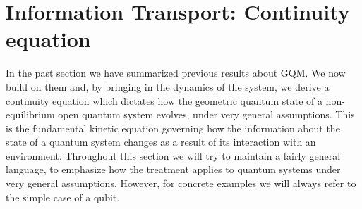 \documentclass[draft,nofootinbib,pre,twocolumn,showpacs,showkeys,preprintnumbers,floatfix]{revtex4-1}
\newcommand{\1}{\mathbbm{1}}
\begin{document}
\section{Information Transport: Continuity equation}
\label{sec:IT}

In the past section we have summarized previous results about GQM. We now build on them 
and, by bringing in the dynamics of the system, we derive 
a continuity equation which dictates how the geometric quantum state of a non-equilibrium 
open quantum system evolves, under very general assumptions. This is the fundamental 
kinetic equation governing how the information about the state of a quantum system 
changes as a result of its interaction with an environment. 
Throughout this section we will try to maintain a fairly general language, to emphasize
how the treatment applies to quantum systems under very general assumptions. However, 
for concrete examples we will always refer to the simple case of a qubit.
\end{document}
